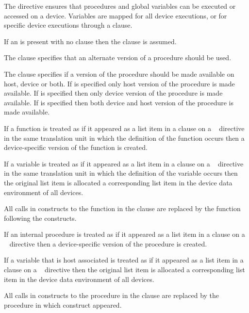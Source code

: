 The   directive ensures that procedures
and global variables can be executed or accessed on a device.
Variables are mapped for all device executions, or for specific
device executions through a  clause.

If an  is present with no clause then the 
clause is assumed.

The  clause specifies that an alternate version of a procedure should be
used.

The  clause specifies if a version of the procedure should be made
available on host, device or both. If  is specified only host version
of the procedure is made available.  If  is specified then only device
version of the procedure is made available.  If  is specified then both
device and host version of the procedure is made available.

\begin{ccppspecific}
If a function is treated as if it appeared as a list item in a  clause
on a ~ directive in the same translation unit in
which the definition of the function occurs then a device-specific version of
the function is created.

If a variable is treated as if it appeared as a list item in a  clause
on a ~ directive in the same translation unit in
which the definition of the variable occurs then the original list item is
allocated a corresponding list item in the device data environment of all
devices.

All calls in  constructs to the function in the  clause
are replaced by the function following the   constructs.
\end{ccppspecific}

\begin{fortranspecific}
If an internal procedure is treated as if it appeared as a
list item in a  clause on a ~ directive
then a device-specific version of the procedure is created.

If a variable that is host associated is treated as if it appeared as a
list item in a  clause on a ~ directive
then the original list item is allocated a corresponding list item in the
device data environment of all devices.


All calls in  constructs to the procedure in the 
clause are replaced by the procedure in which   construct appeared.
\end{fortranspecific}

